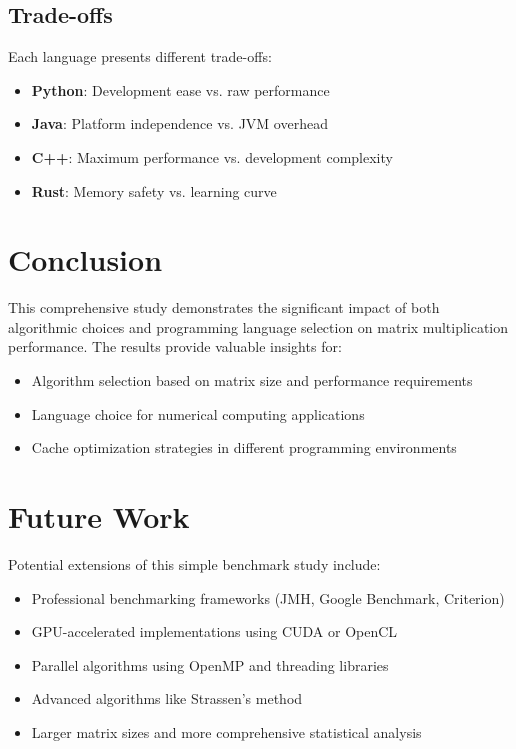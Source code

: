 \documentclass[11pt,a4paper]{article}
\begin{document}
\subsection{Trade-offs}

Each language presents different trade-offs:

\begin{itemize}
    \item \textbf{Python}: Development ease vs. raw performance
    \item \textbf{Java}: Platform independence vs. JVM overhead
    \item \textbf{C++}: Maximum performance vs. development complexity
    \item \textbf{Rust}: Memory safety vs. learning curve
\end{itemize}

\section{Conclusion}

This comprehensive study demonstrates the significant impact of both algorithmic choices and programming language selection on matrix multiplication performance. The results provide valuable insights for:

\begin{itemize}
    \item Algorithm selection based on matrix size and performance requirements
    \item Language choice for numerical computing applications
    \item Cache optimization strategies in different programming environments
\end{itemize}

\section{Future Work}

Potential extensions of this simple benchmark study include:

\begin{itemize}
    \item Professional benchmarking frameworks (JMH, Google Benchmark, Criterion)
    \item GPU-accelerated implementations using CUDA or OpenCL
    \item Parallel algorithms using OpenMP and threading libraries
    \item Advanced algorithms like Strassen's method
    \item Larger matrix sizes and more comprehensive statistical analysis
\end{itemize}
\end{document}
